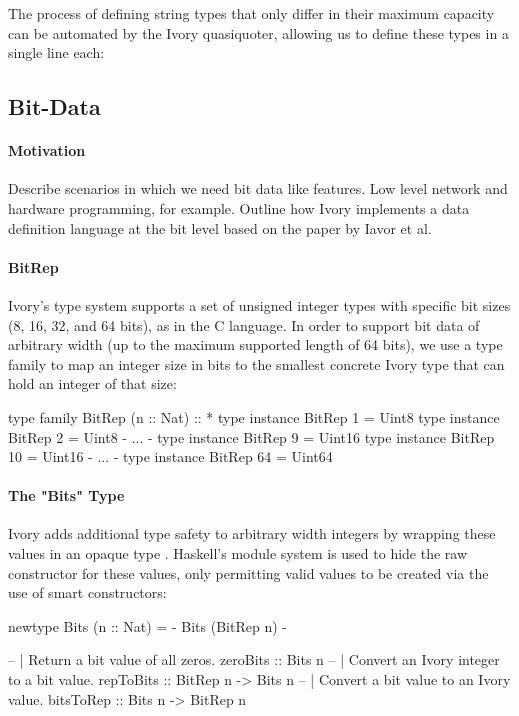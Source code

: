 The process of defining string types that only differ
in their maximum capacity can be automated by the Ivory quasiquoter,
allowing us to define these types in a single line each:

\begin{code}
\end{code}

\subsection{Bit-Data}

\paragraph{Motivation}
Describe scenarios in which we need bit data like features. Low level network
and hardware programming, for example. Outline how Ivory implements a data
definition language at the bit level based on the paper by Iavor et al.

\paragraph{BitRep}
Ivory's type system supports a set of unsigned integer types with
specific bit sizes (8, 16, 32, and 64 bits), as in the C language.
In order to support bit data of arbitrary width (up to the maximum
supported length of 64 bits), we use a type family
 to map an integer size in bits to the smallest
concrete Ivory type that can hold an integer of that size:

\begin{code}
type family BitRep (n :: Nat) :: *
type instance BitRep 1 = Uint8
type instance BitRep 2 = Uint8
{- ... -}
type instance BitRep 9 = Uint16
type instance BitRep 10 = Uint16
{- ... -}
type instance BitRep 64 = Uint64
\end{code}

\paragraph{The "Bits" Type}
Ivory adds additional type safety to arbitrary width integers by
wrapping these values in an opaque type .
Haskell's module system is used to hide the raw constructor for
these values, only permitting valid values to be created via the
use of smart constructors:

\begin{code}
newtype Bits (n :: Nat) = {- Bits (BitRep n) -}

-- | Return a bit value of all zeros.
zeroBits :: Bits n
-- | Convert an Ivory integer to a bit value.
repToBits :: BitRep n -> Bits n
-- | Convert a bit value to an Ivory value.
bitsToRep :: Bits n -> BitRep n
\end{code}

